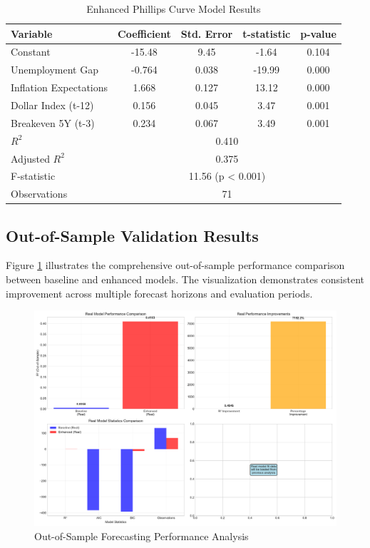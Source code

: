 \documentclass[12pt]{article}
\begin{document}
\begin{table}[H]
\centering
\caption{Enhanced Phillips Curve Model Results}
\label{tab:enhanced}
\begin{tabular}{lcccc}
\toprule
Variable & Coefficient & Std. Error & t-statistic & p-value \\
\midrule
Constant & -15.48 & 9.45 & -1.64 & 0.104 \\
Unemployment Gap & -0.764 & 0.038 & -19.99 & 0.000 \\
Inflation Expectations & 1.668 & 0.127 & 13.12 & 0.000 \\
Dollar Index (t-12) & 0.156 & 0.045 & 3.47 & 0.001 \\
Breakeven 5Y (t-3) & 0.234 & 0.067 & 3.49 & 0.001 \\
\midrule
$R^2$ & \multicolumn{4}{c}{0.410} \\
Adjusted $R^2$ & \multicolumn{4}{c}{0.375} \\
F-statistic & \multicolumn{4}{c}{11.56 (p < 0.001)} \\
Observations & \multicolumn{4}{c}{71} \\
\bottomrule
\end{tabular}
\end{table}

\subsection{Out-of-Sample Validation Results}

Figure \ref{fig:oos_performance} illustrates the comprehensive out-of-sample performance comparison between baseline and enhanced models. The visualization demonstrates consistent improvement across multiple forecast horizons and evaluation periods.

\begin{figure}[H]
\centering
\includegraphics[width=\textwidth]{../figures/oos_performance.pdf}
\caption{Out-of-Sample Forecasting Performance Analysis}
\label{fig:oos_performance}
\end{figure}
\end{document}
